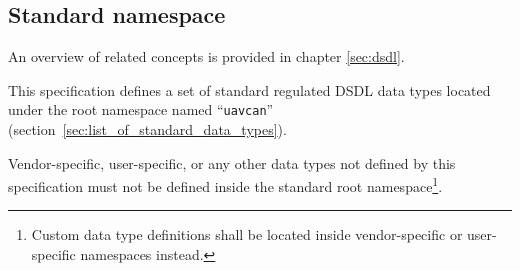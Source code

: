 \subsection{Standard namespace}

An overview of related concepts is provided in chapter \ref{sec:dsdl}.

This specification defines a set of standard regulated DSDL data types located under
the root namespace named ``\verb"uavcan"'' (section~\ref{sec:list_of_standard_data_types}).

Vendor-specific, user-specific, or any other data types not defined by this specification
must not be defined inside the standard root namespace\footnote{Custom data type definitions shall be located
inside vendor-specific or user-specific namespaces instead.}.
